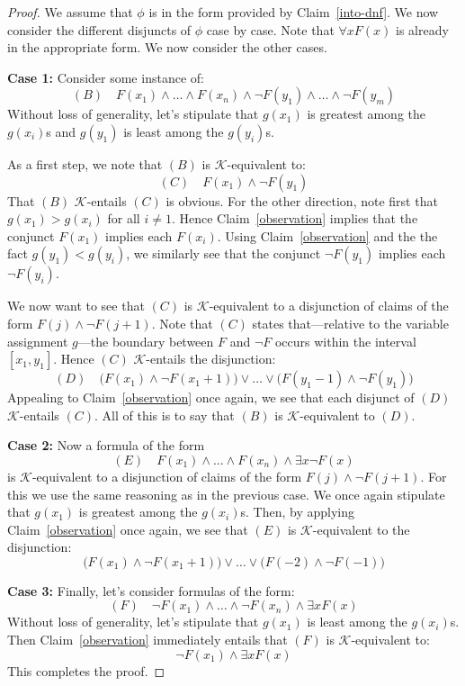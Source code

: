 \documentclass[10pt,a4paper]{amsart}
\begin{document}
\begin{proof}
    We assume that $\phi$ is in the form provided by Claim~\ref{into-dnf}. 
    We now consider the different disjuncts of $\phi$ case by case. 
    Note that $\forall x F(x)$ is already in the appropriate form. 
    We now consider the other cases.
    
    \textbf{Case 1:} Consider some instance of:
    $$(B) \quad F(x_1)\wedge\dots\wedge F(x_n) \wedge \neg F(y_1) \wedge \dots \wedge \neg F(y_m)$$
    Without loss of generality, let's stipulate that $g(x_1)$ is greatest among the $g(x_i)$s and $g(y_1)$ is least among the $g(y_i)$s.
    
    As a first step, we note that $(B)$ is $\mathcal{K}$-equivalent to:
    $$(C) \quad F(x_1)\wedge \neg F(y_1)$$
    That $(B)$ $\mathcal{K}$-entails $(C)$ is obvious. 
    For the other direction, note first that $g(x_1)>g(x_i)$ for all $i\neq 1$. 
    Hence Claim~\ref{observation} implies that the conjunct $F(x_1)$ implies each $F(x_i)$. 
    Using Claim~\ref{observation} and the the fact $g(y_1)<g(y_i)$, we similarly see that the conjunct $\neg F(y_1)$ implies each $\neg F(y_i)$. 
    
    We now want to see that $(C)$ is $\mathcal{K}$-equivalent to a disjunction of claims of the form $F(j)\wedge\neg F(j+1)$. 
    Note that $(C)$ states that---relative to the variable assignment $g$---the boundary between $F$ and $\neg F$ occurs within the interval $[x_1,y_1]$. 
    Hence $(C)$ $\mathcal{K}$-entails the disjunction:
    $$(D) \quad \big(F(x_1)\wedge\neg F(x_1+1)\big)\vee \dots \vee \big(F(y_1-1)\wedge \neg F(y_1)\big)$$
    Appealing to Claim~\ref{observation} once again, we see that each disjunct of $(D)$ $\mathcal{K}$-entails $(C)$. 
    All of this is to say that $(B)$ is $\mathcal{K}$-equivalent to $(D)$.
    
    \textbf{Case 2:} Now a formula of the form 
    $$(E) \quad F(x_1)\wedge\dots\wedge F(x_n) \wedge \exists x \neg F(x)$$
    is $\mathcal{K}$-equivalent to a disjunction of claims of the form $F(j) \wedge \neg F(j+1)$. 
    For this we use the same reasoning as in the previous case. 
    We once again stipulate that $g(x_1)$ is greatest among the $g(x_i)$s. 
    Then, by applying Claim~\ref{observation} once again, we see that $(E)$ is $\mathcal{K}$-equivalent to the disjunction:
    $$\big(F(x_1)\wedge\neg F(x_1+1)\big)\vee \dots \vee \big(F(-2)\wedge \neg F(-1)\big)$$
    
    \textbf{Case 3:} Finally, let's consider formulas of the form:
    $$(F) \quad \neg F(x_1)\wedge\dots\wedge \neg F(x_n) \wedge \exists x F(x)$$
    Without loss of generality, let's stipulate that $g(x_1)$ is least among the $g(x_i)$s. 
    Then Claim~\ref{observation} immediately entails that $(F)$ is $\mathcal{K}$-equivalent to:
    $$\neg F(x_1)\wedge \exists x F(x)$$
    This completes the proof.
\end{proof}
\end{document}
